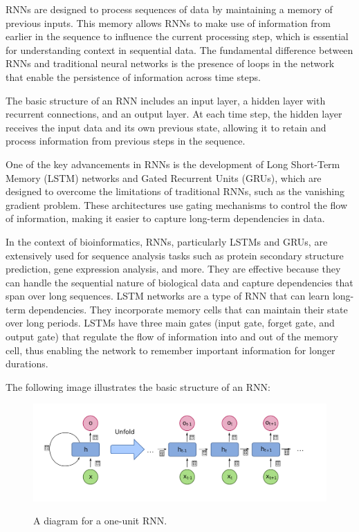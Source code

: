 RNNs are designed to process sequences of data by maintaining a memory of previous inputs. This memory allows RNNs to make use of information from earlier in the sequence to influence the current processing step, which is essential for understanding context in sequential data. The fundamental difference between RNNs and traditional neural networks is the presence of loops in the network that enable the persistence of information across time steps.

The basic structure of an RNN includes an input layer, a hidden layer with recurrent connections, and an output layer. At each time step, the hidden layer receives the input data and its own previous state, allowing it to retain and process information from previous steps in the sequence.

One of the key advancements in RNNs is the development of Long Short-Term Memory (LSTM) networks and Gated Recurrent Units (GRUs), which are designed to overcome the limitations of traditional RNNs, such as the vanishing gradient problem. These architectures use gating mechanisms to control the flow of information, making it easier to capture long-term dependencies in data.

In the context of bioinformatics, RNNs, particularly LSTMs and GRUs, are extensively used for sequence analysis tasks such as protein secondary structure prediction, gene expression analysis, and more. They are effective because they can handle the sequential nature of biological data and capture dependencies that span over long sequences. LSTM networks are a type of RNN that can learn long-term dependencies. They incorporate memory cells that can maintain their state over long periods. LSTMs have three main gates (input gate, forget gate, and output gate) that regulate the flow of information into and out of the memory cell, thus enabling the network to remember important information for longer durations. \autocite{hochreiterLongShortTermMemory1997}

The following image illustrates the basic structure of an RNN:

\begin{figure}[hbt]
    \centering
    \begin{minipage}[t]{\textwidth}
    \caption{A diagram for a one-unit RNN.}
    \includegraphics[width=1\textwidth]{img/Recurrent Neural Network Unfold.png}\\
    \label{fig:RNN}
    \end{minipage}
\end{figure}

